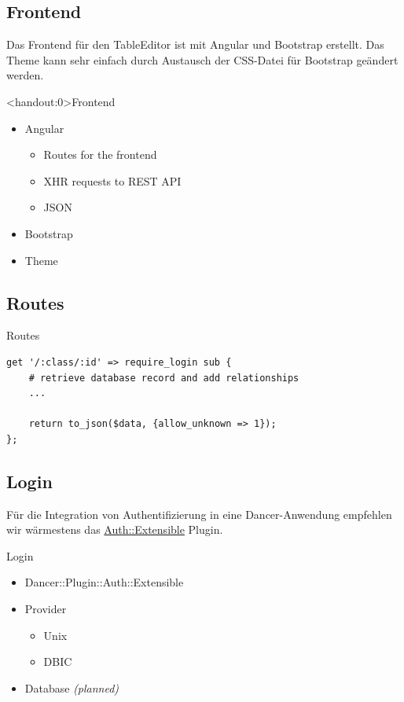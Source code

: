 \subsection{Frontend}
Das Frontend für den TableEditor ist mit Angular und Bootstrap erstellt.
Das Theme kann sehr einfach durch Austausch der CSS-Datei für Bootstrap
geändert werden.

\begin{frame}<handout:0>{Frontend}
\begin{itemize}
\item Angular
\begin{itemize}
\item Routes for the frontend
\item XHR requests to REST API
\item JSON
\end{itemize}
\item Bootstrap
\item Theme
\end{itemize}
\end{frame}

\subsection{Routes}
\begin{frame}[fragile]{Routes}
\begin{lstlisting}
get '/:class/:id' => require_login sub {
    # retrieve database record and add relationships
    ...

    return to_json($data, {allow_unknown => 1});
};
\end{lstlisting}
\end{frame}

\subsection{Login}

Für die Integration von Authentifizierung in eine Dancer-Anwendung empfehlen
wir wärmestens das
\href{https://metacpan.org/pod/Dancer::Plugin::Auth::Extensible}{Auth::Extensible}
Plugin.

\begin{frame}{Login}
\begin{itemize}
\item Dancer::Plugin::Auth::Extensible
\item Provider
\begin{itemize}
\item Unix
\item DBIC
\end{itemize}
\item Database \textit{(planned)}
\end{itemize}
\end{frame}

